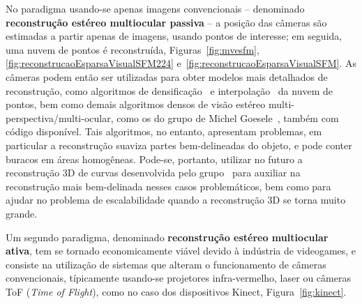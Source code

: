 No paradigma usando-se apenas imagens convencionais -- denominado
\textbf{reconstrução estéreo multiocular passiva} --  a posição das câmeras são
estimadas a partir apenas de imagens, usando pontos de interesse; em seguida, uma
nuvem de pontos é reconstruída, Figuras~\ref{fig:mvesfm}, \ref{fig:reconstrucaoEsparsaVisualSFM224}
e~\ref{fig:reconstrucaoEsparsaVisualSFM}.
As câmeras podem então ser utilizadas para obter modelos mais detalhados de
reconstrução, como algoritmos de densificação~\cite{furukawa2007dense} e
interpolação~\cite{poisson} da nuvem de pontos, bem como demais algoritmos
densos de visão estéreo multi-perspectiva/multi-ocular, como os do grupo de
Michel Goesele~\cite{mve}, também com código disponível. Tais algoritmos, no
entanto, apresentam problemas, em particular a reconstrução suaviza partes
bem-delineadas do objeto, e pode conter buracos em áreas homogêneas. Pode-se,
portanto, utilizar no futuro a reconstrução 3D de curvas 
desenvolvida pelo grupo~\cite{Usumezbas:Fabbri:Kimia:ECCV16,Fabbri:Kimia:IJCV2016,Fabbri:Kimia:CVPR10,Fabbri:Giblin:Kimia:ECCV12}
para auxiliar na reconstrução mais bem-delinada nesses casos problemáticos, bem
como para ajudar no problema de escalabilidade quando a reconstrução 3D se torna
muito grande.  

Um segundo paradigma, denominado \textbf{reconstrução estéreo
multiocular ativa}, tem se tornado economicamente viável devido à indústria de videogames, e
consiste na utilização de sistemas que alteram o funcionamento de câmeras
convencionais, típicamente usando-se projetores infra-vermelho, laser ou câmeras
ToF (\emph{Time of Flight}), como no caso dos dispositivos Kinect,
Figura~\ref{fig:kinect}.

